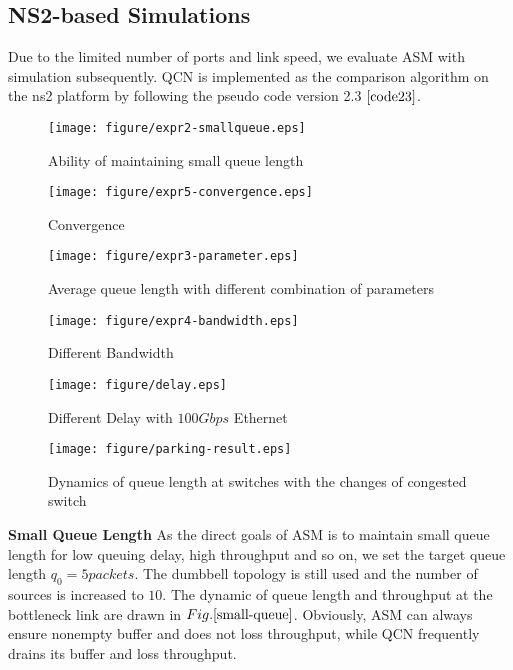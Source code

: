 \documentclass{sig-alternate-10pt}
\def\figurename{Fig.}
\begin{document}
\subsection{NS2-based Simulations}
Due to the limited number of ports and link speed, we evaluate ASM with simulation subsequently. QCN is implemented as the comparison algorithm on the ns2 platform by following the pseudo code version 2.3 $\cite{code23}$.
\begin{figure*}
\begin{minipage}{0.33\textwidth}
\centering
\texttt{[image: figure/expr2-smallqueue.eps]}
\caption{Ability of maintaining small queue length}
\label{small-queue}
\end{minipage}
\vspace{0.1cm}
\begin{minipage}{0.33\textwidth}
\centering
\texttt{[image: figure/expr5-convergence.eps]}
\caption{Convergence}
\label{convergence}
\end{minipage}
\vspace{0.1cm}
\begin{minipage}{0.33\textwidth}
\centering
\texttt{[image: figure/expr3-parameter.eps]}
\caption{Average queue length with different combination of parameters}
\label{parameter}
\end{minipage}
\end{figure*}
\begin{figure*}
\begin{minipage}{0.33\textwidth}
\centering
\texttt{[image: figure/expr4-bandwidth.eps]}
\caption{Different Bandwidth}
\label{bandwidth}
\end{minipage}
\vspace{0.1cm}
\begin{minipage}{0.33\textwidth}
\centering
\texttt{[image: figure/delay.eps]}
\caption{Different Delay with $100Gbps$ Ethernet}
\label{delay}
\end{minipage}
\vspace{0.1cm}
\begin{minipage}{0.33\textwidth}
\centering
\texttt{[image: figure/parking-result.eps]}
\caption{Dynamics of queue length at switches with the changes of congested switch}
\label{park-result}
\end{minipage}
\end{figure*}
\textbf{Small Queue Length}
As the direct goals of ASM is to maintain small queue length for low queuing delay, high throughput and so on, we set the target queue length $q_0=5 packets$. The dumbbell topology is still used and the number of sources is increased to $10$. The dynamic of queue length and throughput at the bottleneck link are drawn in $\figurename{\ref{small-queue}}$. Obviously, ASM can always ensure nonempty buffer and does not loss throughput, while QCN frequently drains its buffer and loss throughput.  \\
\end{document}
